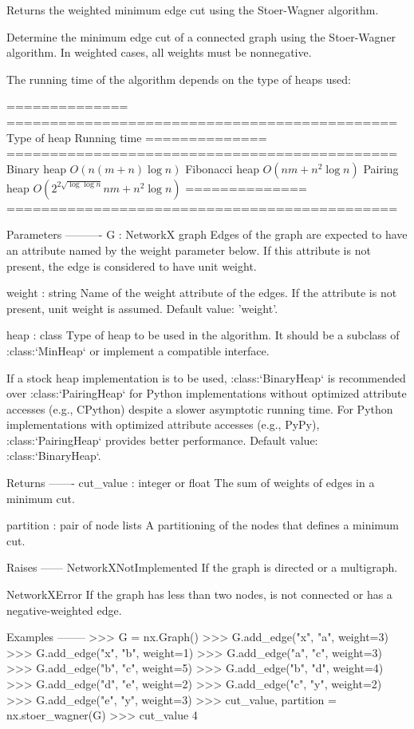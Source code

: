 \begin{DoxyVerb}Returns the weighted minimum edge cut using the Stoer-Wagner algorithm.

Determine the minimum edge cut of a connected graph using the
Stoer-Wagner algorithm. In weighted cases, all weights must be
nonnegative.

The running time of the algorithm depends on the type of heaps used:

============== =============================================
Type of heap   Running time
============== =============================================
Binary heap    $O(n (m + n) \log n)$
Fibonacci heap $O(nm + n^2 \log n)$
Pairing heap   $O(2^{2 \sqrt{\log \log n}} nm + n^2 \log n)$
============== =============================================

Parameters
----------
G : NetworkX graph
    Edges of the graph are expected to have an attribute named by the
    weight parameter below. If this attribute is not present, the edge is
    considered to have unit weight.

weight : string
    Name of the weight attribute of the edges. If the attribute is not
    present, unit weight is assumed. Default value: 'weight'.

heap : class
    Type of heap to be used in the algorithm. It should be a subclass of
    :class:`MinHeap` or implement a compatible interface.

    If a stock heap implementation is to be used, :class:`BinaryHeap` is
    recommended over :class:`PairingHeap` for Python implementations without
    optimized attribute accesses (e.g., CPython) despite a slower
    asymptotic running time. For Python implementations with optimized
    attribute accesses (e.g., PyPy), :class:`PairingHeap` provides better
    performance. Default value: :class:`BinaryHeap`.

Returns
-------
cut_value : integer or float
    The sum of weights of edges in a minimum cut.

partition : pair of node lists
    A partitioning of the nodes that defines a minimum cut.

Raises
------
NetworkXNotImplemented
    If the graph is directed or a multigraph.

NetworkXError
    If the graph has less than two nodes, is not connected or has a
    negative-weighted edge.

Examples
--------
>>> G = nx.Graph()
>>> G.add_edge("x", "a", weight=3)
>>> G.add_edge("x", "b", weight=1)
>>> G.add_edge("a", "c", weight=3)
>>> G.add_edge("b", "c", weight=5)
>>> G.add_edge("b", "d", weight=4)
>>> G.add_edge("d", "e", weight=2)
>>> G.add_edge("c", "y", weight=2)
>>> G.add_edge("e", "y", weight=3)
>>> cut_value, partition = nx.stoer_wagner(G)
>>> cut_value
4
\end{DoxyVerb}
 